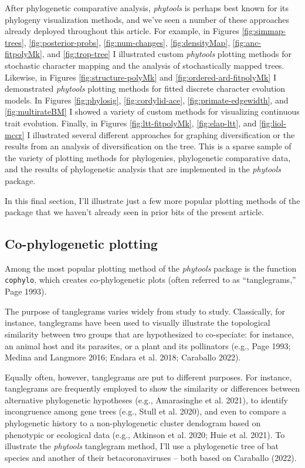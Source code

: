 \documentclass[fleqn,10pt,lineno]{wlpeerj} %
\begin{document}
After phylogenetic comparative analysis, \emph{phytools} is perhaps best known for its phylogeny visualization methods, and we've seen a number of these approaches already deployed throughout this article. For example, in Figures \ref{fig:simmap-trees}, \ref{fig:posterior-probs}, \ref{fig:num-changes}, \ref{fig:densityMap}, \ref{fig:anc-fitpolyMk}, and \ref{fig:trop-tree} I illustrated custom \emph{phytools} plotting methods for stochastic character mapping and the analysis of stochastically mapped trees. Likewise, in Figures \ref{fig:structure-polyMk} and \ref{fig:ordered-ard-fitpolyMk} I demonstrated \emph{phytools} plotting methods for fitted discrete character evolution models. In Figures \ref{fig:phylosig}, \ref{fig:cordylid-ace}, \ref{fig:primate-edgewidth}, and \ref{fig:multirateBM} I showed a variety of custom methods for visualizing continuous trait evolution. Finally, in Figures \ref{fig:ltt-fitpolyMk}, \ref{fig:elap-ltt}, and \ref{fig:liol-mccr} I illustrated several different approaches for graphing diversification or the results from an analysis of diversification on the tree. This is a sparse sample of the variety of plotting methods for phylogenies, phylogenetic comparative data, and the results of phylogenetic analysis that are implemented in the \emph{phytools} package.

In this final section, I'll illustrate just a few more popular plotting methods of the package that we haven't already seen in prior bits of the present article.

\hypertarget{co-phylogenetic-plotting}{%
\subsection{Co-phylogenetic plotting}\label{co-phylogenetic-plotting}}

Among the most popular plotting method of the \emph{phytools} package is the function \texttt{cophylo}, which creates co-phylogenetic plots (often referred to as ``tanglegrams,'' Page 1993).

The purpose of tanglegrams varies widely from study to study. Classically, for instance, tanglegrams have been used to visually illustrate the topological similarity between two groups that are hypothesized to co-speciate: for instance, an animal host and its parasites, or a plant and its pollinators (e.g., Page 1993; Medina and Langmore 2016; Endara et al. 2018; Caraballo 2022).

Equally often, however, tanglegrams are put to different purposes. For instance, tanglegrams are frequently employed to show the similarity or differences between alternative phylogenetic hypotheses (e.g., Amarasinghe et al. 2021), to identify incongruence among gene trees (e.g., Stull et al. 2020), and even to compare a phylogenetic history to a non-phylogenetic cluster dendogram based on phenotypic or ecological data (e.g., Atkinson et al. 2020; Huie et al. 2021). To illustrate the \emph{phytools} tanglegram method, I'll use a phylogenetic tree of bat species and another of their betacoronaviruses -- both based on Caraballo (2022).
\end{document}
